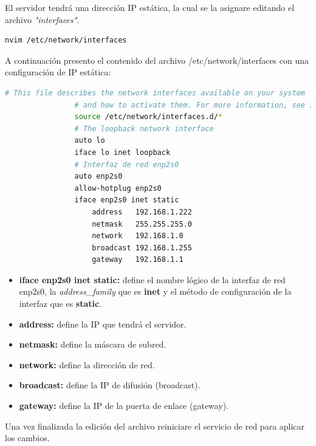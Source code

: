 			El servidor tendrá una dirección IP estática, la cual se la asignare editando el archivo \textit{"interfaces"}.\par
			
			\begin{lstlisting}[language=Bash, caption=Interfaces]		
				nvim /etc/network/interfaces	
			\end{lstlisting}
			
			A continuación presento el contenido del archivo /etc/network/interfaces con una configuración de IP estática:
			
			\begin{lstlisting}[language=Bash, caption=Configuración de IP estática]	
				# This file describes the network interfaces available on your system
				# and how to activate them. For more information, see interfaces(5).	
				source /etc/network/interfaces.d/*
				# The loopback network interface
				auto lo
				iface lo inet loopback	
				# Interfaz de red enp2s0
				auto enp2s0
				allow-hotplug enp2s0
				iface enp2s0 inet static
					address   192.168.1.222
					netmask   255.255.255.0
					network   192.168.1.0
					broadcast 192.168.1.255
					gateway   192.168.1.1
			\end{lstlisting}
			
			\begin{itemize}
				
				\item \textbf{iface enp2s0 inet static:} define el nombre lógico de la interfaz de red enp2s0,
				la \textit{address\_family} que es \textbf{inet} y el método de configuración de la interfaz que es \textbf{static}.
				
				\item \textbf{address:} define la IP que tendrá el servidor.
			
				\item \textbf{netmask:} define la máscara de subred.
			
				\item \textbf{network:} define la dirección de red.
			
				\item \textbf{broadcast:} define la IP de difusión (broadcast).
			
				\item \textbf{gateway:} define la IP de la puerta de enlace (gateway).
			
			\end{itemize}
						
			Una vez finalizada la edición del archivo reiniciare el servicio de red para aplicar los cambios. \par
			
